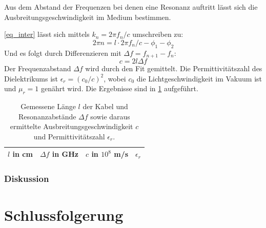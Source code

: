 \documentclass[
	a4paper,
	12pt,
	pagesize,
	ngerman
]{scrartcl}
\begin{document}
	Aus dem Abstand der Frequenzen bei denen eine Resonanz auftritt lässt sich die Ausbreitungsgeschwindigkeit im Medium bestimmen.

	\cref{eq_inter} lässt sich mittels $k_n = 2\pi f_n/c$ umschreiben zu:
	\begin{equation}
		2\pi n = l\cdot2\pi f_n /c -\phi_1 - \phi_2
	\end{equation}
	Und es folgt durch Differenzieren mit $\Delta f = f_{n+1}-f_n$:
	\begin{equation}
	c = 2l\Delta f
	\end{equation}
	Der Frequenzabstand $\Delta f$ wird durch den Fit gemittelt.
	Die Permittivitätszahl des Dielektrikums ist $\epsilon_r=(c_0/c)^2$, wobei $c_0$ die Lichtgeschwindigkeit im Vakuum ist und $\mu_r=1$ genährt wird.
	Die Ergebnisse sind in \cref{tb_res} aufgeführt.

\begin{table}[H]
	\centering
	\begin{tabular}{ c | c | c | c }
		 $l$ in \si{cm} & $\Delta f$ in \si{GHz} &  $c$ in $10^8$ \si{m/s} & $\epsilon_r$ \\ \hline
		 
	\end{tabular}
	\caption{
	Gemessene Länge $l$ der Kabel und Resonanzabstände $\Delta f$ sowie daraus ermittelte Ausbreitungsgeschwindigkeit $c$ und Permittivitätszahl $\epsilon_r$.
	}
	\label{tb_res}
\end{table}
	\subsubsection*{Diskussion}

	\section{Schlussfolgerung}

	\printbibliography
\end{document}
